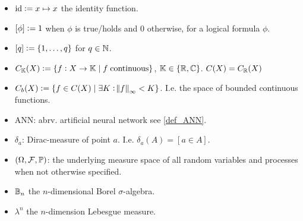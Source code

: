 
\begin{itemize}
  \item $\text{id} \vcentcolon= x \mapsto x$ the identity function.
  \item $[\phi] \vcentcolon= 1$ when $\phi$ is true/holds and $0$ otherwise,
    for a logical formula $\phi$.
  \item $[q] \vcentcolon= \{1,\dots,q\}$ for $q\in \mathbb{N}$.
  \item $C_{\mathbb{K}}(X) \vcentcolon= \{ f : X \to \mathbb{K} \mid f \; \text{continuous} \}$,
    $\mathbb{K} \in \{ \mathbb{R}, \mathbb{C} \}$. $C(X) = C_\mathbb{R}(X)$
  \item $C_b(X) \vcentcolon= \{ f \in C(X) \mid \exists K : \norm{f}_\infty < K \}$.
    I.e. the space of bounded continuous functions.
  \item ANN: abrv. artificial neural network see \cref{def_ANN}.
  \item $\delta_a$: Dirac-measure of point $a$. I.e. $\delta_a(A) = [a \in A]$.
  \item $(\Omega, \mathcal{F}, \mathbb{P})$: the underlying measure space
    of all random variables and processes when not otherwise specified.
  \item $\mathbb{B}_n$ the $n$-dimensional Borel $\sigma$-algebra.
  \item $\lambda^n$ the $n$-dimension Lebesgue measure.
\end{itemize}
